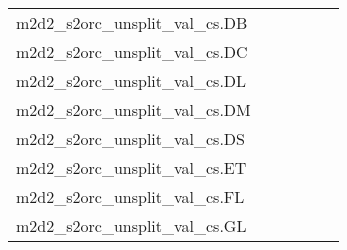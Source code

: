 {\begin{longtable}{m{6cm}m{1.7cm}m{1.7cm}m{1.7cm}m{1.7cm}m{1.7cm}}
	m2d2\_s2orc\_unsplit\_val\_cs.DB  & \colorbox[HTML]{77c578}{\makebox[\mywidth][c]{11.86}} & \colorbox[HTML]{e7f5ad}{\makebox[\mywidth][c]{12.35}} & \colorbox[HTML]{ffffe5}{\makebox[\mywidth][c]{14.66}} & \colorbox[HTML]{def2a6}{\makebox[\mywidth][c]{12.27}} & \colorbox[HTML]{b0de8f}{\makebox[\mywidth][c]{12.03}}\\
	m2d2\_s2orc\_unsplit\_val\_cs.DC  & \colorbox[HTML]{87cc7f}{\makebox[\mywidth][c]{13.60}} & \colorbox[HTML]{e7f5ad}{\makebox[\mywidth][c]{14.02}} & \colorbox[HTML]{ffffe5}{\makebox[\mywidth][c]{16.20}} & \colorbox[HTML]{c2e698}{\makebox[\mywidth][c]{13.79}} & \colorbox[HTML]{77c578}{\makebox[\mywidth][c]{13.56}}\\
	m2d2\_s2orc\_unsplit\_val\_cs.DL  & \colorbox[HTML]{b3df91}{\makebox[\mywidth][c]{14.67}} & \colorbox[HTML]{d8efa2}{\makebox[\mywidth][c]{14.83}} & \colorbox[HTML]{ffffe5}{\makebox[\mywidth][c]{17.05}} & \colorbox[HTML]{c8e89a}{\makebox[\mywidth][c]{14.75}} & \colorbox[HTML]{77c578}{\makebox[\mywidth][c]{14.50}}\\
	m2d2\_s2orc\_unsplit\_val\_cs.DM  & \colorbox[HTML]{77c578}{\makebox[\mywidth][c]{8.11}} & \colorbox[HTML]{e1f3a9}{\makebox[\mywidth][c]{8.38}} & \colorbox[HTML]{ffffe5}{\makebox[\mywidth][c]{9.84}} & \colorbox[HTML]{c3e698}{\makebox[\mywidth][c]{8.27}} & \colorbox[HTML]{89cd7f}{\makebox[\mywidth][c]{8.14}}\\
	m2d2\_s2orc\_unsplit\_val\_cs.DS  & \colorbox[HTML]{77c578}{\makebox[\mywidth][c]{9.63}} & \colorbox[HTML]{e5f5ac}{\makebox[\mywidth][c]{9.99}} & \colorbox[HTML]{ffffe5}{\makebox[\mywidth][c]{11.76}} & \colorbox[HTML]{d3eda0}{\makebox[\mywidth][c]{9.88}} & \colorbox[HTML]{96d385}{\makebox[\mywidth][c]{9.69}}\\
	m2d2\_s2orc\_unsplit\_val\_cs.ET  & \colorbox[HTML]{addd8e}{\makebox[\mywidth][c]{14.80}} & \colorbox[HTML]{d4eea0}{\makebox[\mywidth][c]{14.95}} & \colorbox[HTML]{ffffe5}{\makebox[\mywidth][c]{17.00}} & \colorbox[HTML]{c5e799}{\makebox[\mywidth][c]{14.89}} & \colorbox[HTML]{77c578}{\makebox[\mywidth][c]{14.67}}\\
	m2d2\_s2orc\_unsplit\_val\_cs.FL  & \colorbox[HTML]{77c578}{\makebox[\mywidth][c]{9.51}} & \colorbox[HTML]{e2f3a9}{\makebox[\mywidth][c]{9.84}} & \colorbox[HTML]{ffffe5}{\makebox[\mywidth][c]{11.64}} & \colorbox[HTML]{ceeb9e}{\makebox[\mywidth][c]{9.74}} & \colorbox[HTML]{96d385}{\makebox[\mywidth][c]{9.57}}\\
	m2d2\_s2orc\_unsplit\_val\_cs.GL  & \colorbox[HTML]{e0f2a8}{\makebox[\mywidth][c]{16.51}} & \colorbox[HTML]{d0ec9e}{\makebox[\mywidth][c]{16.43}} & \colorbox[HTML]{ffffe5}{\makebox[\mywidth][c]{18.18}} & \colorbox[HTML]{c1e597}{\makebox[\mywidth][c]{16.38}} & \colorbox[HTML]{77c578}{\makebox[\mywidth][c]{16.21}}\\

\end{longtable}}
